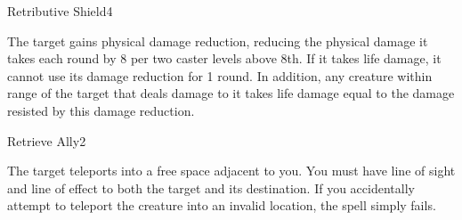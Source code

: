 \begin{spellsection}{Retributive Shield}{4}
\begin{spellheader}
\end{spellheader}
\begin{spellcontent}
    \begin{spelltargetinginfo}
    \end{spelltargetinginfo}
    \begin{spelleffects}
        \spelleffect The target gains physical damage reduction, reducing the physical damage it takes each round by 8  per two caster levels above 8th. If it takes life damage, it cannot use its damage reduction for 1 round. In addition, any creature within \rngmed range of the target that deals damage to it takes life damage equal to the damage resisted by this damage reduction.
        \spelldur \durshort
    \end{spelleffects}
\end{spellcontent}
\begin{spellfooter}
\end{spellfooter}
\end{spellsection}

\begin{spellsection}{Retrieve Ally}{2}
\begin{spellheader}
\end{spellheader}
\begin{spellcontent}
    \begin{spelltargetinginfo}
    \end{spelltargetinginfo}
    \begin{spelleffects}
        \spelleffect The target teleports into a free space adjacent to you. You must have line of sight and line of effect to both the target and its destination. If you accidentally attempt to teleport the creature into an invalid location, the spell simply fails.
    \end{spelleffects}
\end{spellcontent}
\begin{spellfooter}
\end{spellfooter}
\end{spellsection}

